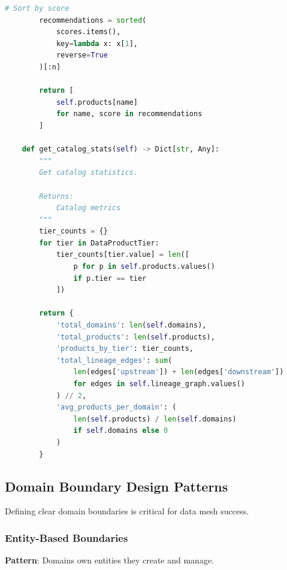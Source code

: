 \begin{lstlisting}[language=Python, caption={Federated Catalog for Cross-Domain Discovery}]
        # Sort by score
        recommendations = sorted(
            scores.items(),
            key=lambda x: x[1],
            reverse=True
        )[:n]

        return [
            self.products[name]
            for name, score in recommendations
        ]

    def get_catalog_stats(self) -> Dict[str, Any]:
        """
        Get catalog statistics.

        Returns:
            Catalog metrics
        """
        tier_counts = {}
        for tier in DataProductTier:
            tier_counts[tier.value] = len([
                p for p in self.products.values()
                if p.tier == tier
            ])

        return {
            'total_domains': len(self.domains),
            'total_products': len(self.products),
            'products_by_tier': tier_counts,
            'total_lineage_edges': sum(
                len(edges['upstream']) + len(edges['downstream'])
                for edges in self.lineage_graph.values()
            ) // 2,
            'avg_products_per_domain': (
                len(self.products) / len(self.domains)
                if self.domains else 0
            )
        }
\end{lstlisting}

\subsection{Domain Boundary Design Patterns}

Defining clear domain boundaries is critical for data mesh success.

\subsubsection{Entity-Based Boundaries}

\textbf{Pattern}: Domains own entities they create and manage.

